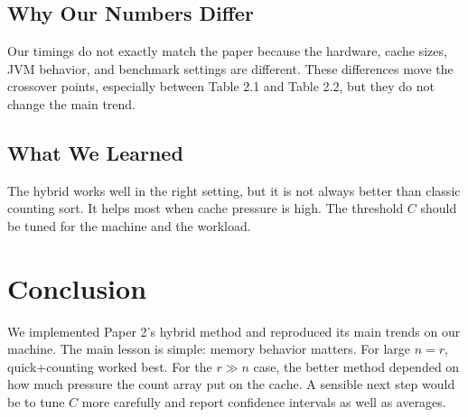 \documentclass[11pt]{article}
\begin{document}
    \subsection{Why Our Numbers Differ}

    Our timings do not exactly match the paper because the hardware, cache sizes, JVM behavior,
    and benchmark settings are different. These differences move the crossover points, especially
    between Table 2.1 and Table 2.2, but they do not change the main trend.

    \subsection{What We Learned}

    The hybrid works well in the right setting, but it is not always better than classic counting
    sort. It helps most when cache pressure is high. The threshold $C$ should be tuned for the
    machine and the workload.

    \section{Conclusion}

    We implemented Paper 2's hybrid method and reproduced its main trends on our machine. The main
    lesson is simple: memory behavior matters. For large $n=r$, quick+counting worked best. For
    the $r \gg n$ case, the better method depended on how much pressure the count array put on the
    cache. A sensible next step would be to tune $C$ more carefully and report confidence
    intervals as well as averages.
\end{document}
